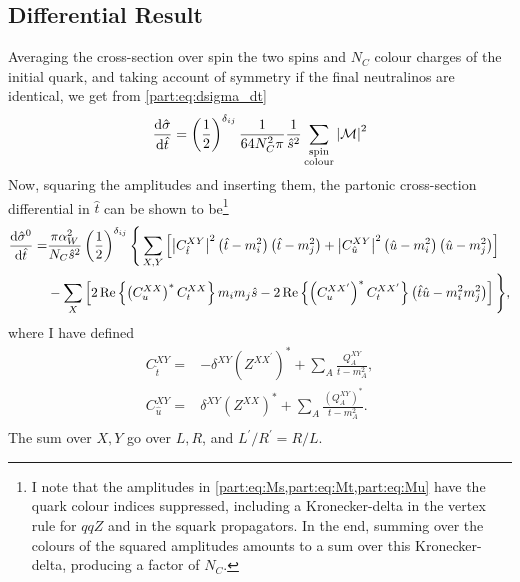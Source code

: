 \documentclass[../main.tex]{subfiles}
\begin{document}
\subsection{Differential Result}
Averaging the cross-section over spin the two spins and \(N_C\) colour charges of the initial quark, and taking account of symmetry if the final neutralinos are identical, we get from \cref{part:eq:dsigma_dt}
\begin{equation}
  \label{part:eq:dxsec}
  \d[\hat{t}]{\hat{\sigma}} = \pclosed{\frac{1}{2}}^{\delta_{ij}} \frac{1}{64 N_C^2 \pi} \frac{1}{\hat{s}^2} \sum_{\substack{\text{spin}\\\text{colour}}} \abs{\M}^2
\end{equation}
Now, squaring the amplitudes and inserting them, the partonic cross-section differential in \(\hat{t}\) can be shown to be\footnote{I note that the amplitudes in \cref{part:eq:Ms,part:eq:Mt,part:eq:Mu} have the quark colour indices suppressed, including a Kronecker-delta in the vertex rule for \(qqZ\) and in the squark propagators. In the end, summing over the colours of the squared amplitudes amounts to a sum over this Kronecker-delta, producing a factor of \(N_C\).}
\begin{align}
  \nonumber
  \d[\hat{t}]{\hat{\sigma}^0} = & \frac{\pi \alpha_W^2}{N_C \hat{s}^2}
  \pclosed{\frac{1}{2}}^{\delta_{ij}} \Bigg\{ \sum_{X,Y}
  \bclosed{\abs{C^{XY}_{\hat{t}}}^2
    \pclosed{\hat{t}-m_i^2}\pclosed{\hat{t}-m_j^2} +
    \abs{C^{XY}_{\hat{u}}}^2
  \pclosed{\hat{u}-m_i^2}\pclosed{\hat{u}-m_j^2}}                      \\
                                & - \sum_X
  \bclosed{2\Re{\pclosed{C_{u}^{XX}}^\ast C_{t}^{XX}} m_i m_j \hat{s} -
    2\Re{\pclosed{C_{u}^{XX^\prime}}^\ast C_{t}^{XX^\prime}}
    \pclosed{\hat{t}\hat{u} - m_i^2m_j^2}} \Bigg\},
\end{align}
where I have defined
\begin{subequations}
  \begin{align}
    C_{\hat{t}}^{XY} = & -\delta^{XY} (Z^{XX^\prime})^\ast + \sum_{A}\frac{Q_A^{XY}}{t-m_A^2}, \\
    C_{\hat{u}}^{XY} = & \delta^{XY} (Z^{XX})^\ast + \sum_{A}\frac{(Q_A^{XY})^\ast}{t-m_A^2}.  \\
  \end{align}
\end{subequations}
The sum over \(X, Y\) go over \(L, R\), and \(L^\prime/R^\prime = R/L\).

\end{document}
